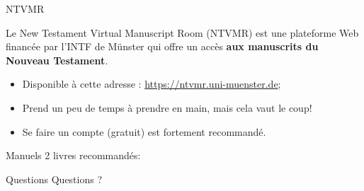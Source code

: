\documentclass[11pt]{beamer}
\begin{document}
\begin{frame}{NTVMR}
  \begin{alertblock}{}
    Le New Testament Virtual Manuscript Room (NTVMR) est une plateforme Web financée par l'INTF de Münster qui offre un accès \textbf{aux manuscrits du Nouveau Testament}.
  \end{alertblock}
  \begin{itemize}
      \item Disponible à cette adresse : \url{https://ntvmr.uni-muenster.de};
      \item Prend un peu de temps à prendre en main, mais cela vaut le coup!
      \item Se faire un compte (gratuit) est fortement recommandé.
  \end{itemize}
\end{frame}

\begin{frame}{Manuels}
    2 livres recommandés:
\end{frame}

\begin{frame}{Questions}
    Questions ?
\end{frame}
\end{document}
